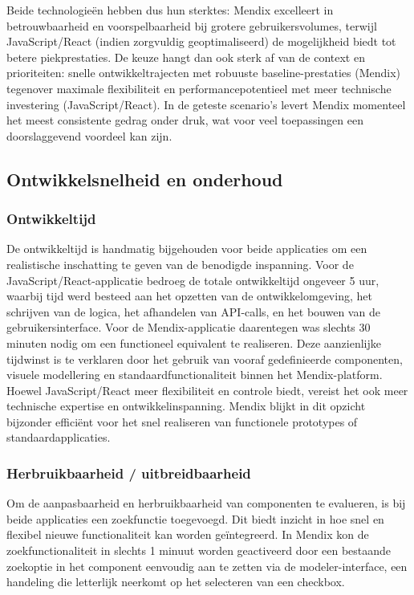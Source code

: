 Beide technologieën hebben dus hun sterktes: Mendix excelleert in betrouwbaarheid en voorspelbaarheid bij grotere gebruikersvolumes, terwijl JavaScript/React (indien zorgvuldig geoptimaliseerd) de mogelijkheid biedt tot betere piekprestaties. De keuze hangt dan ook sterk af van de context en prioriteiten: snelle ontwikkeltrajecten met robuuste baseline-prestaties (Mendix) tegenover maximale flexibiliteit en performancepotentieel met meer technische investering (JavaScript/React). In de geteste scenario’s levert Mendix momenteel het meest consistente gedrag onder druk, wat voor veel toepassingen een doorslaggevend voordeel kan zijn.


\subsection{Ontwikkelsnelheid en onderhoud}

\subsubsection{Ontwikkeltijd}
De ontwikkeltijd is handmatig bijgehouden voor beide applicaties om een realistische inschatting te geven van de benodigde inspanning. Voor de JavaScript/React-applicatie bedroeg de totale ontwikkeltijd ongeveer 5 uur, waarbij tijd werd besteed aan het opzetten van de ontwikkelomgeving, het schrijven van de logica, het afhandelen van \gls{API}-calls, en het bouwen van de gebruikersinterface. Voor de Mendix-applicatie daarentegen was slechts 30 minuten nodig om een functioneel equivalent te realiseren. Deze aanzienlijke tijdwinst is te verklaren door het gebruik van vooraf gedefinieerde componenten, visuele modellering en standaardfunctionaliteit binnen het Mendix-platform. Hoewel JavaScript/React meer flexibiliteit en controle biedt, vereist het ook meer technische expertise en ontwikkelinspanning. Mendix blijkt in dit opzicht bijzonder efficiënt voor het snel realiseren van functionele prototypes of standaardapplicaties.

\subsubsection{Herbruikbaarheid / uitbreidbaarheid}
Om de aanpasbaarheid en herbruikbaarheid van componenten te evalueren, is bij beide applicaties een zoekfunctie toegevoegd. Dit biedt inzicht in hoe snel en flexibel nieuwe functionaliteit kan worden geïntegreerd. In Mendix kon de zoekfunctionaliteit in slechts 1 minuut worden geactiveerd door een bestaande zoekoptie in het component eenvoudig aan te zetten via de modeler-interface, een handeling die letterlijk neerkomt op het selecteren van een checkbox. 

